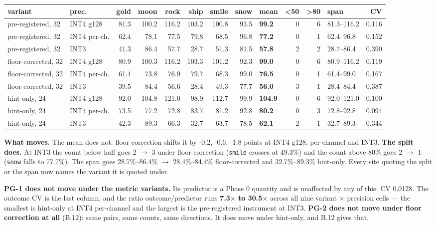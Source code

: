 \begin{table}[t]
\centering\footnotesize
\begin{tabularx}{\textwidth}{>{\hsize=1.000\hsize\raggedright\arraybackslash}Xlrrrrrrlrrlr}
\toprule
variant & prec. & gold & moon & rock & ship & smile & snow & mean & <50 & >80 & span & CV \\
\midrule
pre-registered, 32 & INT4 g128 & 81.3 & 100.2 & 116.2 & 103.2 & 100.8 & 93.5 & \textbf{99.2} & 0 & 6 & 81.3--116.2 & 0.116 \\
pre-registered, 32 & INT4 per-ch. & 62.4 & 78.1 & 77.5 & 79.8 & 68.5 & 96.8 & \textbf{77.2} & 0 & 1 & 62.4--96.8 & 0.152 \\
pre-registered, 32 & INT3 & 41.3 & 86.4 & 57.7 & 28.7 & 51.3 & 81.5 & \textbf{57.8} & 2 & 2 & 28.7--86.4 & 0.390 \\
floor-corrected, 32 & INT4 g128 & 80.9 & 100.3 & 116.2 & 103.3 & 101.2 & 92.3 & \textbf{99.0} & 0 & 6 & 80.9--116.2 & 0.119 \\
floor-corrected, 32 & INT4 per-ch. & 61.4 & 73.8 & 76.9 & 79.7 & 68.3 & 99.0 & \textbf{76.5} & 0 & 1 & 61.4--99.0 & 0.167 \\
floor-corrected, 32 & INT3 & 39.5 & 84.4 & 56.6 & 28.4 & 49.3 & 77.7 & \textbf{56.0} & 3 & 1 & 28.4--84.4 & 0.387 \\
hint-only, 24 & INT4 g128 & 92.0 & 104.8 & 121.0 & 98.9 & 112.7 & 99.9 & \textbf{104.9} & 0 & 6 & 92.0--121.0 & 0.100 \\
hint-only, 24 & INT4 per-ch. & 73.5 & 77.2 & 72.8 & 83.7 & 81.2 & 92.8 & \textbf{80.2} & 0 & 3 & 72.8--92.8 & 0.094 \\
hint-only, 24 & INT3 & 42.3 & 89.3 & 66.3 & 32.7 & 63.7 & 78.5 & \textbf{62.1} & 2 & 1 & 32.7--89.3 & 0.344 \\
\bottomrule
\end{tabularx}
\end{table}

\textbf{What moves.} The mean does not: floor correction shifts it by -0.2, -0.6, -1.8 points at INT4 g128, per-channel and INT3. \textbf{The split does.} At INT3 the count below half goes 2 $\rightarrow$ 3 under floor correction (\texttt{smile} crosses at 49.3\%) and the count above 80\% goes 2 $\rightarrow$ 1 (\texttt{snow} falls to 77.7\%). The span goes 28.7\%--86.4\% $\rightarrow$ 28.4\%--84.4\% floor-corrected and 32.7\%--89.3\% hint-only. Every site quoting the split or the span now names the variant it is quoted under.

\textbf{PG-1 does not move under the metric variants.} Its predictor is a Phase 0 quantity and is unaffected by any of this: CV 0.0128. The outcome CV is the last column, and the ratio outcome/predictor runs \textbf{7.3$\times$ to 30.5$\times$} across all nine variant $\times$ precision cells --- the smallest is hint-only at INT4 per-channel and the largest is the pre-registered instrument at INT3. \textbf{PG-2 does not move under floor correction at all} (B.12): same pairs, same counts, same directions. It does move under hint-only, and B.12 gives that.

